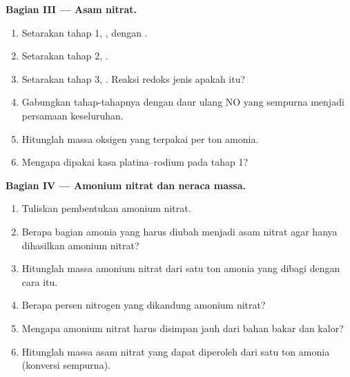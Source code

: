 \begin{problem}
\medskip
\noindent\textbf{Bagian III --- Asam nitrat.}
\begin{enumerate}[resume]
  \item Setarakan tahap 1, , dengan . %
  \item Setarakan tahap 2, . %
  \item Setarakan tahap 3, . Reaksi redoks %
        jenis apakah itu?
  \item Gabungkan tahap-tahapnya dengan daur ulang NO yang sempurna
        menjadi persamaan keseluruhan.
  \item Hitunglah massa oksigen yang terpakai per ton amonia.
  \item Mengapa dipakai kasa platina--rodium pada tahap 1?
\end{enumerate}

\medskip
\noindent\textbf{Bagian IV --- Amonium nitrat dan neraca massa.}
\begin{enumerate}[resume]
  \item Tuliskan pembentukan amonium nitrat.
  \item Berapa bagian amonia yang harus diubah menjadi asam nitrat agar
        hanya dihasilkan amonium nitrat?
  \item Hitunglah massa amonium nitrat dari satu ton amonia yang dibagi
        dengan cara itu.
  \item Berapa persen nitrogen yang dikandung amonium nitrat?
  \item Mengapa amonium nitrat harus disimpan jauh dari bahan bakar dan
        kalor?
  \item Hitunglah massa asam nitrat yang dapat diperoleh dari satu ton
        amonia (konversi sempurna).
\end{enumerate}
\end{problem}
